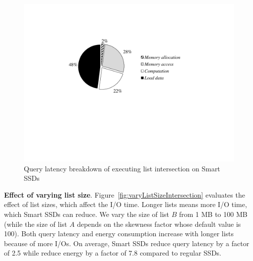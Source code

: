 \begin{figure}[htbp]
	\centering
		\includegraphics[width=0.8\columnwidth]{figures/timeBreakDownSmartSSD.pdf}
	\caption{Query latency breakdown of executing list intersection on Smart SSDs}
	\label{fig:timeBreakDownSmartSSD}
\end{figure}


\textbf{Effect of varying list size}.
Figure~\ref{fig:varyListSizeIntersection} evaluates the effect of list sizes, which affect the I/O time.
Longer lists means more I/O time, which Smart SSDs can reduce.
We vary the size of list $B$ from 1 MB to 100 MB (while the size of list $A$ depends on the skewness factor whose default value is 100).
Both query latency and energy consumption increase with longer lists because of more I/Os.
On average, Smart SSDs reduce query latency by a factor of 2.5 while reduce energy by a factor of 7.8 compared to regular SSDs.

